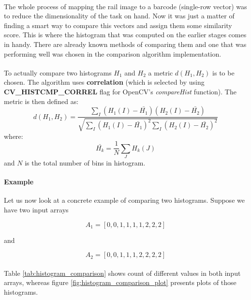 \paragraph{}
The whole process of mapping the rail image to a barcode (single-row vector) was to reduce the dimensionality of the task on hand. Now it was just a matter of finding a smart way to compare this vectors and assign them some similarity score. This is where the histogram that was computed on the earlier stages comes in handy. There are already known methods of comparing them and one that was performing well was chosen in the comparison algorithm implementation.

\paragraph{}
To actually compare two histograms $H_1$ and $H_2$ a metric $d(H_1, H_2)$ is to be chosen. The algorithm uses \textbf{correlation} (which is selected by using \textbf{CV\_HISTCMP\_CORREL} flag for OpenCV's \textit{compareHist} function). The metric is then defined as:
\begin{equation}
	d(H_1, H_2) = \frac{\sum_I(H_1(I) - \bar{H_1})(H_2(I) - \bar{H_2})}{\sqrt{\sum_I(H_1(I) - \bar{H_1})^2 \sum_I(H_2(I) - \bar{H_2})^2}}
	\label{eq:hist_comparison}
\end{equation}
where:
\begin{equation}
	\bar{H_k} = \frac{1}{N} \sum_J H_k(J)
\end{equation}
and $N$ is the total number of bins in histogram.

\paragraph{Example}
Let us now look at a concrete example of comparing two histograms. Suppose we have two input arrays



\begin{equation*}
	A_1 = [0,0,1,1,1,1,2,2,2]
\end{equation*}

and

\begin{equation*}
	A_2 = [0,0,1,1,1,2,2,2,2]
\end{equation*}

\paragraph{}
Table \ref{tab:histogram_comparison} shows count of different values in both input arrays, whereas figure \ref{fig:histogram_comparison_plot} presents plots of those histograms.

